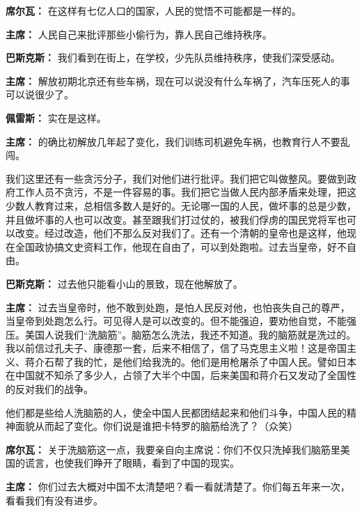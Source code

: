 \begin{duihua}
\item[\textbf{席尔瓦：}]在这样有七亿人口的国家，人民的觉悟不可能都是一样的。

\item[\textbf{主席：}] 人民自己来批评那些小偷行为，靠人民自己维持秩序。

\item[\textbf{巴斯克斯：}] 我们看到在街上，在学校，少先队员维持秩序，使我们深受感动。

\item[\textbf{主席：}] 解放初期北京还有些车祸，现在可以说没有什么车祸了，汽车压死人的事可以说很少了。

\item[\textbf{佩雷斯：}] 实在是这样。

\item[\textbf{主席：}] 的确比初解放几年起了变化，我们训练司机避免车祸，也教育行人不要乱闯。

我们这里还有一些贪污分子，我们对他们进行批评。我们把它叫做整风。要做到政府工作人员不贪污，不是一件容易的事。我们把它当做人民内部矛盾来处理，把这少数人教育过来，总相信多数人是好的。无论哪一国的人民，做坏事的总是少数，并且做坏事的人也可以改变。甚至跟我们打过仗的，被我们俘虏的国民党将军也可以改变。经过改造，他们不那么反对我们了。还有一个清朝的皇帝也是这样，他现在全国政协搞文史资料工作，他现在自由了，可以到处跑啦。过去当皇帝，好不自由。

\item[\textbf{巴斯克斯：}] 过去他只能看小山的景致，现在他解放了。

\item[\textbf{主席：}] 过去当皇帝时，他不敢到处跑，是怕人民反对他，也怕丧失自己的尊严，当皇帝到处跑怎么行。可见得人是可以改变的。但不能强迫，要劝他自觉，不能强压。美国人说我们“洗脑筋”。脑筋怎么洗法，我还不知道。我的脑筋就是洗过的。我以前信过孔夫子、康德那一套，后来不相信了，信了马克思主义啦！这是帝国主义、蒋介石帮了我的忙，是他们给我洗的。他们是用枪屠杀了中国人民。譬如日本在中国就不知杀了多少人，占领了大半个中国，后来美国和蒋介石又发动了全国性的反对我们的战争。

他们都是些给人洗脑筋的人，使全中国人民都团结起来和他们斗争，中国人民的精神面貌从而起了变化。你们说是谁把卡特罗的脑筋给洗了？（众笑）

\item[\textbf{席尔瓦：}] 关于洗脑筋这一点，我要亲自向主席说：你们不仅只洗掉我们脑筋里美国的谎言，也使我们睁开了眼睛，看到了中国的现实。

\item[\textbf{主席：}] 你们过去大概对中国不太清楚吧？看一看就清楚了。你们每五年来一次，看看我们有没有进步。


\end{duihua}
